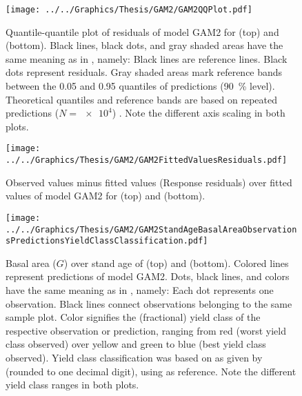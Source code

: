 \begin{figure}[h]
  \centering
  \texttt{[image: ../../Graphics/Thesis/GAM2/GAM2QQPlot.pdf]}
  \caption{Quantile-quantile plot of residuals of model GAM2 for \Beech{} (top) and \Spruce{} (bottom).  Black lines, black dots, and gray shaded areas have the same meaning as in , namely:  Black lines are reference lines.  Black dots represent residuals.  Gray shaded areas mark reference bands between the \num{0.05} and \num{0.95} quantiles of predictions (\SI{90}{\percent} level).  Theoretical quantiles and reference bands are based on repeated predictions (\(N = \num{e4}\)) \parencite{Augustin2012}.  Note the different axis scaling in both plots.}
  \label{fig:GAM2QQPlot}
\end{figure}

\begin{figure}[h]
  \centering
  \texttt{[image: ../../Graphics/Thesis/GAM2/GAM2FittedValuesResiduals.pdf]}
  \caption{Observed values minus fitted values (Response residuals) over fitted values of model GAM2 for \Beech{} (top) and \Spruce{} (bottom).}
  \label{fig:GAM2FittedValuesResiduals}
\end{figure}

\begin{figure}[h]
  \centering
  \texttt{[image: ../../Graphics/Thesis/GAM2/GAM2StandAgeBasalAreaObservationsPredictionsYieldClassClassification.pdf]}
  \caption{Basal area (\(G\)) over stand age of \Beech{} (top) and \Spruce{} (bottom).  Colored lines represent predictions of model GAM2.  Dots, black lines, and colors have the same meaning as in , namely:  Each dot represents one observation.  Black lines connect observations belonging to the same sample plot.  Color signifies the (fractional) yield class of the respective observation or prediction, ranging from red (worst yield class observed) over yellow and green to blue (best yield class observed).  Yield class classification was based on \ProductivityIndexText{} as given by  (rounded to one decimal digit), using  as reference.  Note the different yield class ranges in both plots.}
  \label{fig:GAM2StandAgeBasalAreaObservationsPredictionsYieldClassClassification}
\end{figure}


